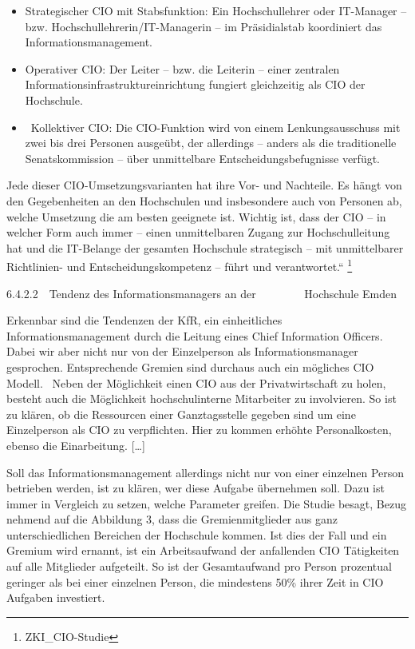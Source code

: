 \documentclass{article}
\begin{document}
\begin{itemize}
\item Strategischer CIO mit Stabsfunktion: Ein Hochschullehrer oder IT-Manager – bzw. Hochschullehrerin/IT-Managerin –
im Präsidialstab koordiniert das Informationsmanagement. 
\item Operativer CIO: Der Leiter – bzw. die Leiterin – einer zentralen Informationsinfrastruktureinrichtung fungiert
gleichzeitig als CIO der Hochschule. 
\item \ Kollektiver CIO: Die CIO-Funktion wird von einem Lenkungsausschuss mit zwei bis drei Personen ausgeübt, der
allerdings – anders als die traditionelle Senatskommission – über unmittelbare Entscheidungsbefugnisse verfügt. 
\end{itemize}
Jede dieser CIO-Umsetzungsvarianten hat ihre Vor- und Nachteile. Es hängt von den Gegebenheiten an den Hochschulen und
insbesondere auch von Personen ab, welche Umsetzung die am besten geeignete ist. Wichtig ist, dass der CIO – in welcher
Form auch immer – einen unmittelbaren Zugang zur Hochschulleitung hat und die IT-Belange der gesamten Hochschule
strategisch – mit unmittelbarer Richtlinien- und Entscheidungskompetenz – führt und verantwortet.“
\footnote{ZKI\_CIO-Studie }


\bigskip

6.4.2.2\ \ Tendenz des Informationsmanagers an der \ \ \ \ \ \ \ \ Hochschule Emden

Erkennbar sind die Tendenzen der KfR, ein einheitliches Informationsmanagement durch die Leitung eines Chief Information
Officers. Dabei wir aber nicht nur von der Einzelperson als Informationsmanager gesprochen. Entsprechende Gremien sind
durchaus auch ein mögliches CIO Modell. \ Neben der Möglichkeit einen CIO aus der Privatwirtschaft zu holen, besteht
auch die Möglichkeit hochschulinterne Mitarbeiter zu involvieren. So ist zu klären, ob die Ressourcen einer
Ganztagsstelle gegeben sind um eine Einzelperson als CIO zu verpflichten. Hier zu kommen erhöhte Personalkosten, ebenso
die Einarbeitung. […]

\newline
Soll das Informationsmanagement allerdings nicht nur von einer einzelnen Person betrieben werden, ist zu klären, wer
diese Aufgabe übernehmen soll. Dazu ist immer in Vergleich zu setzen, welche Parameter greifen. Die Studie besagt,
Bezug nehmend auf die Abbildung 3, dass die Gremienmitglieder aus ganz unterschiedlichen Bereichen der Hochschule
kommen. Ist dies der Fall und ein Gremium wird ernannt, ist ein Arbeitsaufwand der anfallenden CIO Tätigkeiten auf alle
Mitglieder aufgeteilt. So ist der Gesamtaufwand pro Person prozentual geringer als bei einer einzelnen Person, die
mindestens 50\% ihrer Zeit in CIO Aufgaben investiert. 
\end{document}
